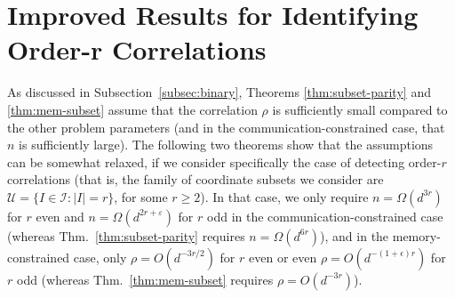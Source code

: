 \documentclass[final, 12pt]{colt2018}
\newcommand{\subsecref}[1]{Subsection~\ref{#1}}
\newcommand{\thmref}[1]{Thm.~\ref{#1}}
\begin{document}




\section{Improved Results for Identifying Order-r Correlations}\label{sec:tuples}

As discussed in \subsecref{subsec:binary}, Theorems \ref{thm:subset-parity} and \ref{thm:mem-subset} assume that the correlation $\rho$ is sufficiently small compared to the other problem parameters (and in the communication-constrained case, that $n$ is sufficiently large). The following two theorems show that the assumptions can be somewhat relaxed, if we consider specifically the case of detecting order-$r$ correlations (that is, the family of coordinate subsets we consider are $\mathcal{U} = \{ I \in \mathcal{I} \colon \lvert I \rvert = r\}$, for some $r\geq 2$). In that case, we only require $n=\Omega(d^{3r})$ for $r$ even and $n = \Omega(d^{2r+\varepsilon})$ for $r$ odd in the communication-constrained case (whereas \thmref{thm:subset-parity} requires $n=\Omega(d^{6r})$), and in the memory-constrained case, only $\rho=O(d^{-3r/2})$ for $r$ even or even $\rho=O(d^{-(1+\epsilon)r})$ for $r$ odd (whereas \thmref{thm:mem-subset} requires $\rho=O(d^{-3r})$). 
\end{document}
